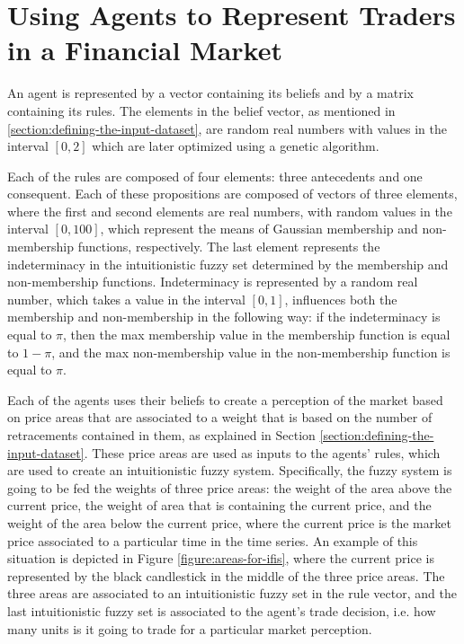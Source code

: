 \section{Using Agents to Represent Traders in a Financial Market}
\label{section:using-agents-to-represent-traders-in-a-financial-market:implementation}

An agent is represented by a vector containing its beliefs and by a matrix
containing its rules. The elements in the belief vector, as mentioned in
\ref{section:defining-the-input-dataset}, are random real numbers with values in
the interval $[0, 2]$ which are later optimized using a genetic algorithm.

Each of the rules are composed of four elements: three antecedents and one
consequent. Each of these propositions are composed of vectors of three
elements, where the first and second elements are real numbers, with random
values in the interval $[0, 100]$, which represent the means of Gaussian
membership and non-membership functions, respectively. The last element
represents the indeterminacy in the intuitionistic fuzzy set determined by the
membership and non-membership functions. Indeterminacy is represented by a
random real number, which takes a value in the interval $[0, 1]$, influences
both the membership and non-membership in the following way: if the
indeterminacy is equal to $\pi$, then the max membership value in the membership
function is equal to $1 - \pi$, and the max non-membership value in the
non-membership function is equal to $\pi$.

Each of the agents uses their beliefs to create a perception of the market based
on price areas that are associated to a weight that is based on the number of
retracements contained in them, as explained in Section
\ref{section:defining-the-input-dataset}. These price areas are used as inputs
to the agents' rules, which are used to create an intuitionistic fuzzy
system. Specifically, the fuzzy system is going to be fed the weights of three
price areas: the weight of the area above the current price, the weight of area
that is containing the current price, and the weight of the area below the
current price, where the current price is the market price associated to a
particular time in the time series. An example of this situation is depicted in
Figure \ref{figure:areas-for-ifis}, where the current price is represented by
the black candlestick in the middle of the three price areas. The three areas
are associated to an intuitionistic fuzzy set in the rule vector, and the last
intuitionistic fuzzy set is associated to the agent's trade decision, i.e. how
many units is it going to trade for a particular market perception.


